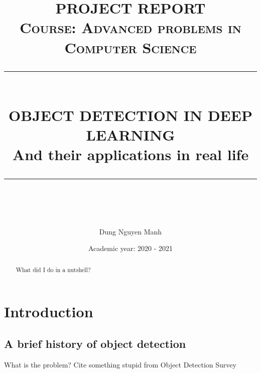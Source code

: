 \documentclass[12pt]{report}
\newcommand{\HRule}[1]{\rule{\linewidth}{#1}}
\begin{document}
\title{ \normalsize \textsc{PROJECT REPORT\\
Course: Advanced problems in Computer Science}
		\\ [5.0cm]
		\HRule{0.5pt} \\
		\LARGE \textbf{\uppercase{OBJECT DETECTION IN DEEP LEARNING}} 
		\\ [0.25 cm]
		\large {And their applications in real life}
		\HRule{2pt} \\ [0.5 cm]
		\normalsize  \vspace*{5\baselineskip}}

\date{ 
    \large{Academic year: 2020 - 2021}
}

\author{
        Dung Nguyen Manh \\
    }

\newpage
\maketitle

\sectionfont{\scshape}

\tableofcontents
\newpage


\begin{abstract}
    What did I do in a nutshell?     
\end{abstract}


\chapter{Introduction}
\section{A brief history of object detection}
What is the problem?
Cite something stupid from Object Detection Survey\cite{zou2019object}

\end{document}
